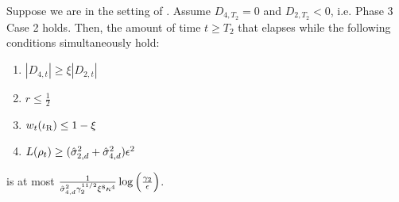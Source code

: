 \begin{lemma} \label{lemma:phase3_case2_particles_away_from_root}
Suppose we are in the setting of . Assume $D_{4, T_2} = 0$ and $D_{2, T_2} < 0$, i.e. Phase 3 Case 2 holds. Then, the amount of time $t \geq T_2$ that elapses while the following conditions simultaneously hold:
\begin{enumerate}
    \item $|D_{4, t}| \geq \xi |D_{2, t}|$
    \item $r \leq \frac{1}{2}$
    \item $w_t(\iota_{\textup{R}}) \leq 1 - \xi$
    \item $L(\rho_t) \geq (\hat{\sigma}_{2, d}^2 + \hat{\sigma}_{4, d}^2) \epsilon^2$
\end{enumerate}
is at most $\frac{1}{\hat{\sigma}_{4, d}^2 \gamma_2^{11/2} \xi^8 \kappa^4} \log\Big(\frac{\gamma_2}{\epsilon}\Big)$.
\end{lemma}
